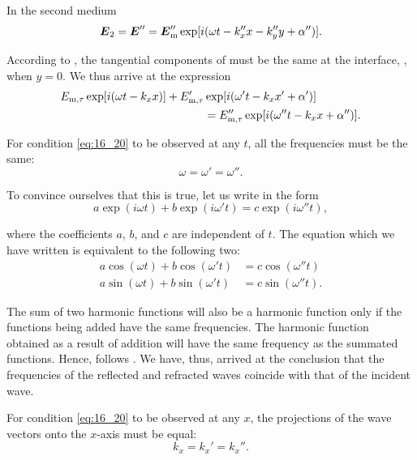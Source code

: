 \noindent
In the second medium
\begin{equation}\label{eq:16_19}
    \boldsymbol{E}_2 = \boldsymbol{E}'' = \boldsymbol{E}_{\text{m}}'' \exp[i (\omega t - k_x'' x - k_y'' y + \alpha'')].
\end{equation}

\noindent
According to , the tangential components of  must be the same at the interface, \ie, when $y = 0$.
We thus arrive at the expression
\begin{align}
    E_{\text{m,$\tau$}} \exp[i(\omega t - k_xx)] + E_{\text{m,$\tau$}}' &\exp[i(\omega' t - k_xx' + \alpha')] \nonumber\\
    &= E_{\text{m,$\tau$}}'' \exp[i(\omega'' t - k_xx + \alpha'')].\label{eq:16_20}
\end{align}

For condition \eqref{eq:16_20} to be observed at any $t$, all the frequencies must be the same:
\begin{equation}\label{eq:16_21}
    \omega = \omega' = \omega''.
\end{equation}

\noindent
To convince ourselves that this is true, let us write  in the form
\begin{equation*}
    a \exp(i\omega t) + b \exp(i\omega' t) = c\exp(i\omega'' t),
\end{equation*}

\noindent
where the coefficients $a$, $b$, and $c$ are independent of $t$.
The equation which we have written is equivalent to the following two:
\begin{align*}
    a \cos(\omega t) + b \cos(\omega' t) &= c \cos(\omega'' t)\\
    a \sin(\omega t) + b \sin(\omega' t) &= c \sin(\omega'' t).
\end{align*}

\noindent
The sum of two harmonic functions will also be a harmonic function only if the functions being added have the same frequencies.
The harmonic function obtained as a result of addition will have the same frequency as the summated functions.
Hence, follows .
We have, thus, arrived at the conclusion that the frequencies of the reflected and refracted waves coincide with that of the incident wave.

For condition \eqref{eq:16_20} to be observed at any $x$, the projections of the wave vectors onto the $x$-axis must be equal:
\begin{equation}\label{eq:16_22}
    k_x = k_x' = k_x''.
\end{equation}

